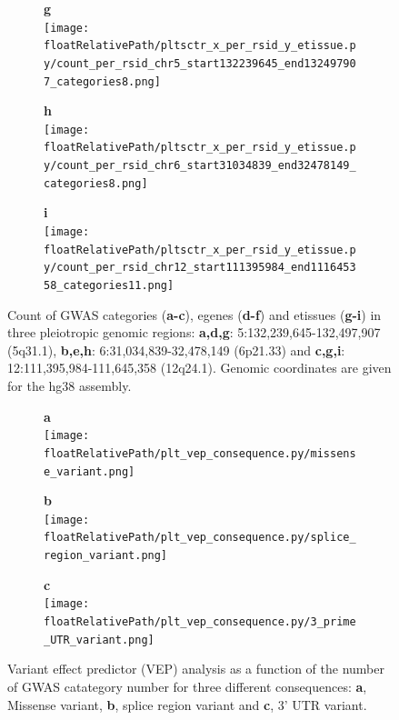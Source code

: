 \begin{figure}[!ht]
\begin{subfigure}[]{.33\textwidth}
\textbf{g}
\\
\texttt{[image: \\floatRelativePath/pltsctr\_x\_per\_rsid\_y\_etissue.py/count\_per\_rsid\_chr5\_start132239645\_end132497907\_categories8.png]}
\end{subfigure}
%
\begin{subfigure}[]{.33\textwidth}
\textbf{h}
\\
\texttt{[image: \\floatRelativePath/pltsctr\_x\_per\_rsid\_y\_etissue.py/count\_per\_rsid\_chr6\_start31034839\_end32478149\_categories8.png]}
\end{subfigure}
%
\begin{subfigure}[]{.33\textwidth}
\textbf{i}
\\
\texttt{[image: \\floatRelativePath/pltsctr\_x\_per\_rsid\_y\_etissue.py/count\_per\_rsid\_chr12\_start111395984\_end111645358\_categories11.png]}
\end{subfigure}

\caption{Count of GWAS categories (\textbf{a-c}), egenes (\textbf{d-f}) and etissues (\textbf{g-i}) in three pleiotropic genomic regions: \textbf{a,d,g}: 5:132,239,645-132,497,907 (5q31.1), \textbf{b,e,h}: 6:31,034,839-32,478,149 (6p21.33) and \textbf{c,g,i}: 12:111,395,984-111,645,358 (12q24.1). Genomic coordinates are given for the hg38 assembly.} \label{fig:region_gwas_egenes_tissues}
%
\end{figure}

%
%

\begin{figure}[!]
\centering
%
\begin{subfigure}[]{.33\textwidth}
\textbf{a}
\\
\texttt{[image: \\floatRelativePath/plt\_vep\_consequence.py/missense\_variant.png]}
%
\end{subfigure}
%
\begin{subfigure}[]{.33\textwidth}
\textbf{b}
\\
\texttt{[image: \\floatRelativePath/plt\_vep\_consequence.py/splice\_region\_variant.png]}
%
\end{subfigure}
%
\begin{subfigure}[]{.33\textwidth}
\textbf{c}
\\
\texttt{[image: \\floatRelativePath/plt\_vep\_consequence.py/3\_prime\_UTR\_variant.png]}
%
\end{subfigure}
%
\caption{Variant effect predictor (VEP) analysis as a function of the number of GWAS catategory number for three different consequences: \textbf{a}, Missense variant, \textbf{b}, splice region variant and \textbf{c}, 3' UTR variant.} \label{fig:vep_consequence}
%
\end{figure}


